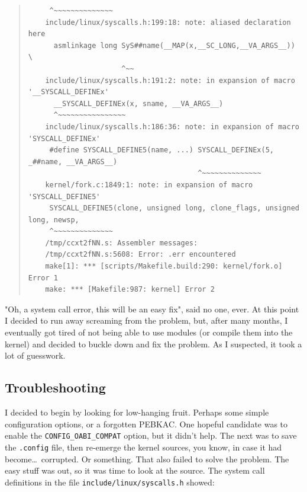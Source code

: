 \documentclass{article}
\begin{document}
\begin{quote}
\begin{verbatim}
	 ^~~~~~~~~~~~~~~
	include/linux/syscalls.h:199:18: note: aliased declaration here
	  asmlinkage long SyS##name(__MAP(x,__SC_LONG,__VA_ARGS__)) \
	                  ^~~
	include/linux/syscalls.h:191:2: note: in expansion of macro '__SYSCALL_DEFINEx'
	  __SYSCALL_DEFINEx(x, sname, __VA_ARGS__)
	  ^~~~~~~~~~~~~~~~~
	include/linux/syscalls.h:186:36: note: in expansion of macro 'SYSCALL_DEFINEx'
	 #define SYSCALL_DEFINE5(name, ...) SYSCALL_DEFINEx(5, _##name, __VA_ARGS__)
	                                    ^~~~~~~~~~~~~~~
	kernel/fork.c:1849:1: note: in expansion of macro 'SYSCALL_DEFINE5'
	 SYSCALL_DEFINE5(clone, unsigned long, clone_flags, unsigned long, newsp,
	 ^~~~~~~~~~~~~~~
	/tmp/ccxt2fNN.s: Assembler messages:
	/tmp/ccxt2fNN.s:5608: Error: .err encountered
	make[1]: *** [scripts/Makefile.build:290: kernel/fork.o] Error 1
	make: *** [Makefile:987: kernel] Error 2
\end{verbatim}
\end{quote}

"Oh, a system call error, this will be an easy fix", said no one, ever.  At this point I decided to run away screaming from the problem, but, after many months, I eventually got tired of not being able to use modules (or compile them into the kernel) and decided to buckle down and fix the problem.  As I suspected, it took a lot of guesswork.

\subsection{Troubleshooting}

I decided to begin by looking for low-hanging fruit.  Perhaps some simple configuration options, or a forgotten PEBKAC.  One hopeful candidate was to enable the \texttt{CONFIG_OABI_COMPAT} option, but it didn't help.  The next was to save the \texttt{.config} file, then re-emerge the kernel sources, you know, in case it had become\ldots~corrupted.  Or something.  That also failed to solve the problem.  The easy stuff was out, so it was time to look at the source.  The system call definitions in the file \texttt{include/linux/syscalls.h} showed:
\end{document}
